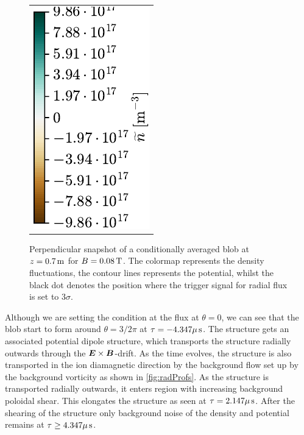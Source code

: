 \begin{figure}[h!]
\begin{tabular}{ccc}
  \multicolumn{3}{c}{\hspace*{2cm}\includegraphics[angle=-90]{fig/results/blobs/matrix-perp-blobs-B0_0.08-fluct/colorbar}}
  \\
\end{tabular}
\caption{Perpendicular snapshot of a conditionally averaged blob at $z=0.7\, \text{m}$ for $B=0.08\, \text{T}$.
    The colormap represents the density fluctuations,
    the contour lines represents the potential, whilst the black dot denotes the position where the trigger signal for radial flux is set to $3\sigma$.
}
\label{fig:perpBlob008}
\end{figure}
%
Although we are setting the condition at the flux at $\theta = 0$, we can see that the blob start to form around $\theta = 3/2 \pi$ at $\tau=-4.347\mu \, \text{s}$.
The structure gets an associated potential dipole structure, which transports the structure radially outwards through the $\boldsymbol{E}\times\boldsymbol{B}$-drift.
As the time evolves, the structure is also transported in the ion diamagnetic direction by the background flow set up by the background vorticity as shown in \cref{fig:radProfs}.
As the structure is transported radially outwards, it enters region with increasing background poloidal shear.
This elongates the structure as seen at $\tau=2.147\mu \, \text{s}$.
After the shearing of the structure only background noise of the density and potential remains at $\tau \geq4.347\mu \, \text{s}$.

